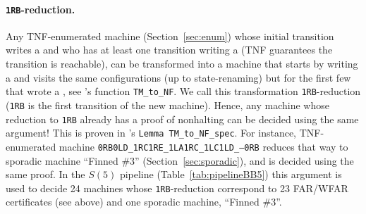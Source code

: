 \paragraph{\texttt{1RB}-reduction.} Any TNF-enumerated machine (Section~\ref{sec:enum}) whose initial transition writes a \szero and who has at least one transition writing a \sone (TNF guarantees the transition is reachable), can be transformed into a machine that starts by writing a \sone and visits the same configurations (up to state-renaming) but for the first few that wrote a \szero, see \CoqBB's function \texttt{TM\_to\_NF}. We call this transformation \texttt{1RB}-reduction (\texttt{1RB} is the first transition of the new machine). Hence, any machine whose reduction to \texttt{1RB} already has a proof of nonhalting can be decided using the same argument! This is proven in \CoqBB's \texttt{Lemma TM\_to\_NF\_spec}. For instance, TNF-enumerated machine \texttt{0RB0LD\_1RC1RE\_1LA1RC\_1LC1LD\_---0RB} reduces that way to sporadic machine ``Finned \#3'' (Section~\ref{sec:sporadic}), and is decided using the same proof. In the $S(5)$ pipeline (Table~\ref{tab:pipelineBB5}) this argument is used to decide 24 machines whose \texttt{1RB}-reduction correspond to 23 FAR/WFAR certificates (see above) and one sporadic machine, ``Finned \#3''.
